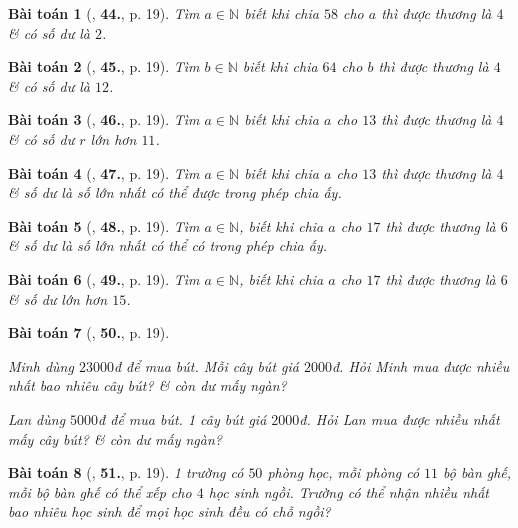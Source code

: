 \documentclass{article}
\numberwithin{equation}{section}
\newtheorem{baitoan}{Bài toán}[section]
\begin{document}
\begin{baitoan}[\cite{Trong_Toan_6_2021}, \textbf{44.}, p. 19]
	Tìm $a\in\mathbb{N}$ biết khi chia $58$ cho $a$ thì được thương là $4$ \& có số dư là $2$.
\end{baitoan}

\begin{baitoan}[\cite{Trong_Toan_6_2021}, \textbf{45.}, p. 19]
	Tìm $b\in\mathbb{N}$ biết khi chia $64$ cho $b$ thì được thương là $4$ \& có số dư là $12$.
\end{baitoan}

\begin{baitoan}[\cite{Trong_Toan_6_2021}, \textbf{46.}, p. 19]
	Tìm $a\in\mathbb{N}$ biết khi chia $a$ cho $13$ thì được thương là $4$ \& có số dư $r$ lớn hơn $11$.
\end{baitoan}

\begin{baitoan}[\cite{Trong_Toan_6_2021}, \textbf{47.}, p. 19]
	Tìm $a\in\mathbb{N}$ biết khi chia $a$ cho $13$ thì được thương là $4$ \& số dư là số lớn nhất có thể được trong phép chia ấy.
\end{baitoan}

\begin{baitoan}[\cite{Trong_Toan_6_2021}, \textbf{48.}, p. 19]
	Tìm $a\in\mathbb{N}$, biết khi chia $a$ cho $17$ thì được thương là $6$ \& số dư là số lớn nhất có thể có trong phép chia ấy.
\end{baitoan}

\begin{baitoan}[\cite{Trong_Toan_6_2021}, \textbf{49.}, p. 19]
	Tìm $a\in\mathbb{N}$, biết khi chia $a$ cho $17$ thì được thương là $6$ \& số dư lớn hơn $15$.
\end{baitoan}

\begin{baitoan}[\cite{Trong_Toan_6_2021}, \textbf{50.}, p. 19]
	\begin{enumerate*}
		\item Minh dùng $23000$đ để mua bút. Mỗi cây bút giá $2000$đ. Hỏi Minh mua được nhiều nhất bao nhiêu cây bút? \& còn dư mấy ngàn?
		\item Lan dùng $5000$đ để mua bút. 1 cây bút giá $2000$đ. Hỏi Lan mua được nhiều nhất mấy cây bút? \& còn dư mấy ngàn?
	\end{enumerate*}
\end{baitoan}

\begin{baitoan}[\cite{Trong_Toan_6_2021}, \textbf{51.}, p. 19]
	1 trường có $50$ phòng học, mỗi phòng có $11$ bộ bàn ghế, mỗi bộ bàn ghế có thể xếp cho $4$ học sinh ngồi. Trường có thể nhận nhiều nhất bao nhiêu học sinh để mọi học sinh đều có chỗ ngồi?
\end{baitoan}
\end{document}
